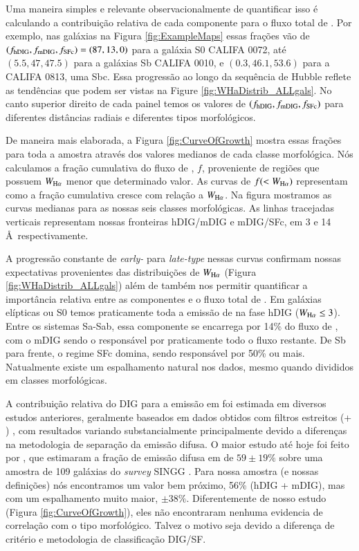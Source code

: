 Uma maneira simples e relevante observacionalmente de quantificar isso é calculando a contribuição relativa de cada componente para o fluxo total de \Ha. Por exemplo, nas galáxias na Figura \ref{fig:ExampleMaps} essas frações vão de $(f_{\rm hDIG} , f_{\rm mDIG} , f_{\rm SFc}) = (87,13,0)$ para a galáxia S0 CALIFA 0072, até $(5.5,47,47.5)$ para a galáxias Sb CALIFA 0010, e $(0.3,46.1,53.6)$ para a CALIFA 0813, uma Sbc. Essa progressão ao longo da sequência de Hubble reflete as tendências que podem ser vistas na Figure \ref{fig:WHaDistrib_ALLgals}. No canto superior direito de cada painel temos os valores de $(f_{\rm hDIG} , f_{\rm mDIG} , f_{\rm SFc})$ para diferentes distâncias radiais e diferentes tipos morfológicos.

De maneira mais elaborada, a Figura \ref{fig:CurveOfGrowth} mostra essas frações para toda a amostra através dos valores medianos de cada classe morfológica. Nós calculamos a fração cumulativa do fluxo de \Ha, $f$, proveniente de regiões que possuem $W_{\Ha}$ menor que determinado valor. As curvas de $f(<W_{\Ha})$ representam como a fração cumulativa cresce com relação a $W_{\Ha}$. Na figura mostramos as curvas medianas para as nossas seis classes morfológicas. As linhas tracejadas verticais representam nossas fronteiras hDIG/mDIG e mDIG/SFc, em 3 e 14 \AA\ respectivamente.

A progressão constante de {\em early-} para {\em late-type} nessas curvas confirmam nossas expectativas provenientes das distribuições de $W_{\Ha}$ (Figura \ref{fig:WHaDistrib_ALLgals}) além de também nos permitir quantificar a importância relativa entre as componentes e o fluxo total de \Ha. Em galáxias elípticas ou S0 temos praticamente toda a emissão de \Ha na fase hDIG ($W_{\Ha} \le 3$). Entre os sistemas Sa-Sab, essa componente se encarrega por 14\% do fluxo de \Ha, com o mDIG sendo o responsável por praticamente todo o fluxo restante. De Sb para frente, o regime SFc domina, sendo responsável por 50\% ou mais. Natualmente existe um espalhamento natural nos dados, mesmo quando divididos em classes morfológicas.

A contribuição relativa do DIG para a emissão em \Ha foi estimada em diversos estudos anteriores, geralmente baseados em dados obtidos com filtros estreitos (\Ha + \nii) \citep{Ferguson.etal.1996, Zurita.etal.2000, Thilker.etal.2002, Oey.etal.2007}, com resultados variando substancialmente principalmente devido a diferenças na metodologia de separação da emissão difusa. O maior estudo até hoje foi feito por \citet{Oey.etal.2007}, que estimaram a fração de emissão difusa em \Ha de $59\pm19 \%$ sobre uma amostra de 109 galáxias do {\em survey} SINGG \citep{Meurer.etal.2006}. Para nossa amostra (e nossas definições) nós encontramos um valor bem próximo, 56\% (hDIG + mDIG), mas com um espalhamento muito maior, $\pm38 \%$. Diferentemente de nosso estudo (Figura \ref{fig:CurveOfGrowth}), eles não encontraram nenhuma evidencia de correlação com o tipo morfológico. Talvez o motivo seja devido a diferença de critério e metodologia de classificação DIG/SF.



